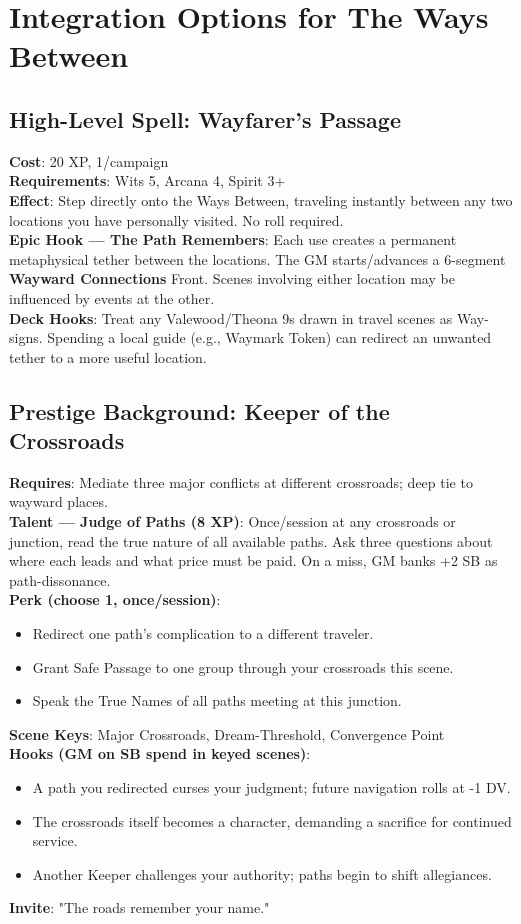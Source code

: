 \section*{Integration Options for The Ways Between}
\label{sec:ways-between-integration}

\subsection*{High-Level Spell: Wayfarer's Passage}
\textbf{Cost}: 20 XP, 1/campaign \\
\textbf{Requirements}: Wits 5, Arcana 4, Spirit 3+ \\
\textbf{Effect}: Step directly onto the Ways Between, traveling instantly between any two locations you have personally visited. No roll required. \\
\textbf{Epic Hook --- The Path Remembers}: Each use creates a permanent metaphysical tether between the locations. The GM starts/advances a 6-segment \textbf{Wayward Connections} Front. Scenes involving either location may be influenced by events at the other. \\
\textbf{Deck Hooks}: Treat any Valewood/Theona 9s drawn in travel scenes as Way-signs. Spending a local guide (e.g., Waymark Token) can redirect an unwanted tether to a more useful location.

\subsection*{Prestige Background: Keeper of the Crossroads}
\textbf{Requires}: Mediate three major conflicts at different crossroads; deep tie to wayward places. \\
\textbf{Talent --- Judge of Paths (8 XP)}: Once/session at any crossroads or junction, read the true nature of all available paths. Ask three questions about where each leads and what price must be paid. On a miss, GM banks +2 SB as path-dissonance. \\
\textbf{Perk (choose 1, once/session)}:
\begin{itemize}
    \item Redirect one path's complication to a different traveler.
    \item Grant Safe Passage to one group through your crossroads this scene.
    \item Speak the True Names of all paths meeting at this junction.
\end{itemize}
\textbf{Scene Keys}: Major Crossroads, Dream-Threshold, Convergence Point \\
\textbf{Hooks (GM on SB spend in keyed scenes)}:
\begin{itemize}
    \item A path you redirected curses your judgment; future navigation rolls at -1 DV.
    \item The crossroads itself becomes a character, demanding a sacrifice for continued service.
    \item Another Keeper challenges your authority; paths begin to shift allegiances.
\end{itemize}
\textbf{Invite}: "The roads remember your name."

